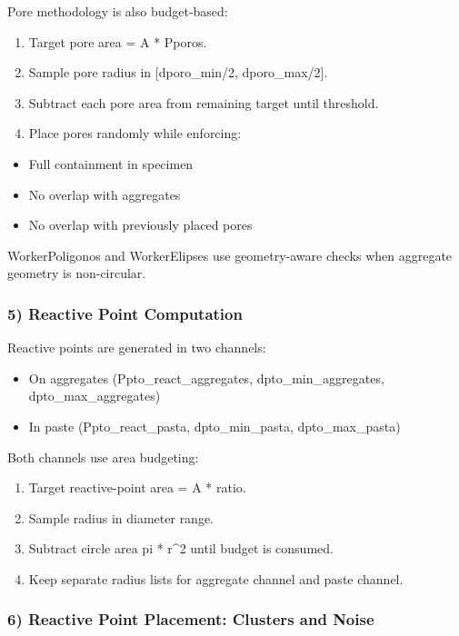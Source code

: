 ﻿\documentclass[11pt,a4paper]{article}
\begin{document}
Pore methodology is also budget-based:


\begin{enumerate}
\item Target pore area = A * Pporos.
\item Sample pore radius in [dporo\_min/2, dporo\_max/2].
\item Subtract each pore area from remaining target until threshold.
\item Place pores randomly while enforcing:
\end{enumerate}
\begin{itemize}
\item Full containment in specimen
\item No overlap with aggregates
\item No overlap with previously placed pores
\end{itemize}

WorkerPoligonos and WorkerElipses use geometry-aware checks when aggregate geometry is non-circular.


\subsubsection*{5) Reactive Point Computation}

Reactive points are generated in two channels:


\begin{itemize}
\item On aggregates (Ppto\_react\_aggregates, dpto\_min\_aggregates, dpto\_max\_aggregates)
\item In paste (Ppto\_react\_pasta, dpto\_min\_pasta, dpto\_max\_pasta)
\end{itemize}

Both channels use area budgeting:


\begin{enumerate}
\item Target reactive-point area = A * ratio.
\item Sample radius in diameter range.
\item Subtract circle area pi * r\textasciicircum{}2 until budget is consumed.
\item Keep separate radius lists for aggregate channel and paste channel.
\end{enumerate}

\subsubsection*{6) Reactive Point Placement: Clusters and Noise}
\end{document}
